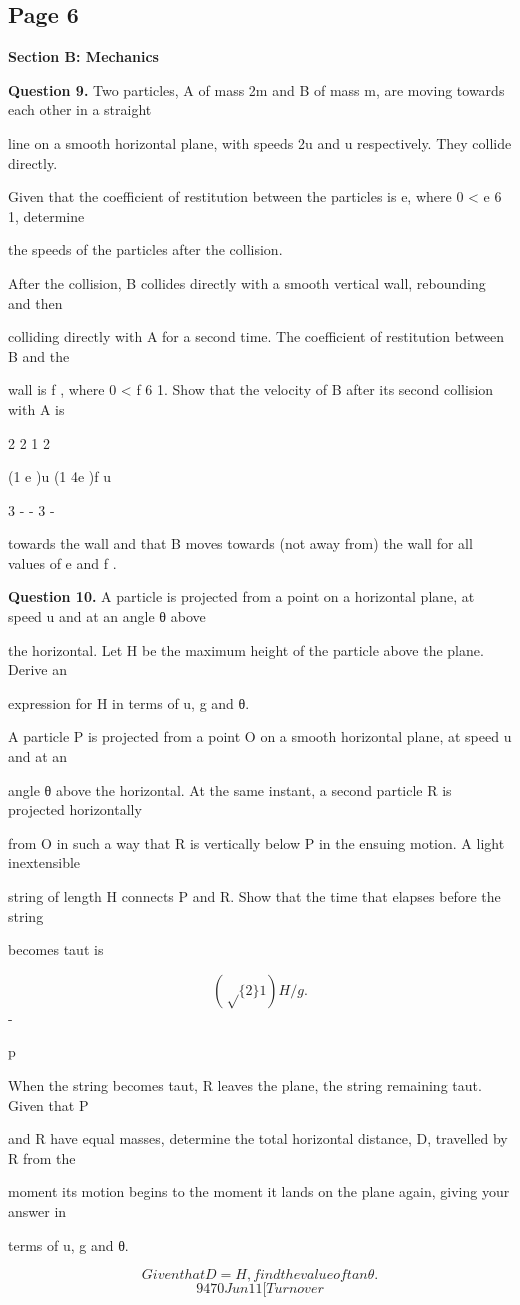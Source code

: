 \documentclass[12pt]{article}
\begin{document}
\subsection*{Page 6}
\begin{flushleft}
\bigskip\textbf{Section B: Mechanics}\par
\bigskip\textbf{Question 9.} Two particles, A of mass 2m and B of mass m, are moving towards each other in a straight\par
line on a smooth horizontal plane, with speeds 2u and u respectively. They collide directly.\par
Given that the coefficient of restitution between the particles is e, where 0 < e 6 1, determine\par
the speeds of the particles after the collision.\par
After the collision, B collides directly with a smooth vertical wall, rebounding and then\par
colliding directly with A for a second time. The coefficient of restitution between B and the\par
wall is f , where 0 < f 6 1. Show that the velocity of B after its second collision with A is\par
2 2 1 2\par
(1 e )u (1 4e )f u\par
3 - - 3 -\par
towards the wall and that B moves towards (not away from) the wall for all values of e and f .\par
\bigskip\textbf{Question 10.} A particle is projected from a point on a horizontal plane, at speed u and at an angle θ above\par
the horizontal. Let H be the maximum height of the particle above the plane. Derive an\par
expression for H in terms of u, g and θ.\par
A particle P is projected from a point O on a smooth horizontal plane, at speed u and at an\par
angle θ above the horizontal. At the same instant, a second particle R is projected horizontally\par
from O in such a way that R is vertically below P in the ensuing motion. A light inextensible\par
string of length H connects P and R. Show that the time that elapses before the string\par
becomes taut is\par
\[(\sqrt\{2\} 1) H/g .\]
-\par
p\par
When the string becomes taut, R leaves the plane, the string remaining taut. Given that P\par
and R have equal masses, determine the total horizontal distance, D, travelled by R from the\par
moment its motion begins to the moment it lands on the plane again, giving your answer in\par
terms of u, g and θ.\par
\[Given that D = H, find the value of tan θ.\]
\[9470 Jun11 [Turn over\]
\end{flushleft}
\end{document}
